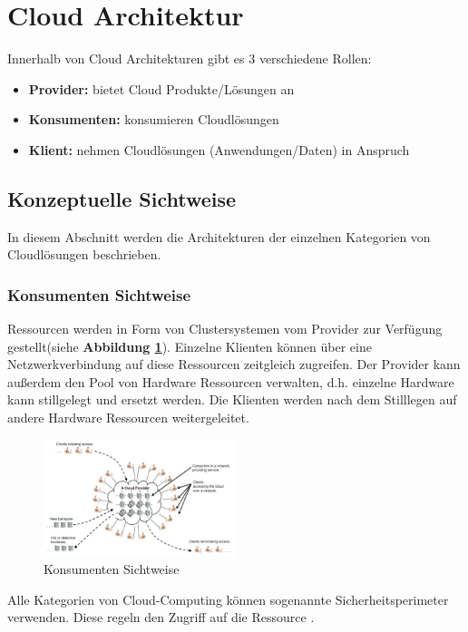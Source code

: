 \section{Cloud Architektur}

Innerhalb von Cloud Architekturen gibt es 3 verschiedene Rollen:
\begin{itemize}
	\item \textbf{Provider:} bietet Cloud Produkte/Lösungen an
	\item \textbf{Konsumenten:} konsumieren Cloudlösungen
	\item \textbf{Klient:} nehmen Cloudlösungen (Anwendungen/Daten) in Anspruch
\end{itemize}

\subsection{Konzeptuelle Sichtweise}

In diesem Abschnitt werden die Architekturen der einzelnen Kategorien von Cloudlösungen beschrieben.

\subsubsection{Konsumenten Sichtweise}
Ressourcen werden in Form von Clustersystemen vom Provider zur Verfügung gestellt(siehe \textbf{Abbildung \ref{ConsumerView}}).
Einzelne Klienten können über eine Netzwerkverbindung auf diese Ressourcen zeitgleich zugreifen. Der Provider kann außerdem den Pool
von Hardware Ressourcen verwalten, d.h. einzelne Hardware kann stillgelegt und ersetzt werden. Die Klienten werden nach dem Stilllegen
auf andere Hardware Ressourcen weitergeleitet.
\begin{figure}[h]
    \centering
	\includegraphics[width=0.5\textwidth]{Images/ConsumerView}
	\caption{Konsumenten Sichtweise \cite{Badger}}
	\label{ConsumerView}
\end{figure}
Alle Kategorien von Cloud-Computing können sogenannte Sicherheitsperimeter verwenden. Diese regeln den Zugriff auf die Ressource \cite{Badger}.

